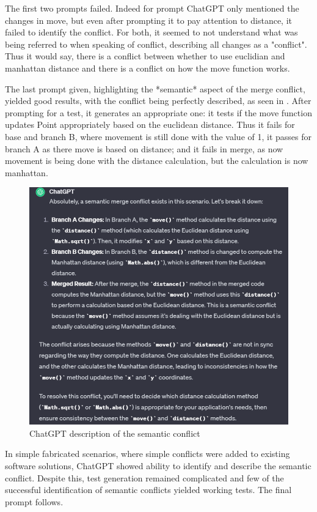 The first two prompts failed. Indeed for prompt ChatGPT only mentioned the changes in move, but even after prompting it to pay attention to distance, it failed to identify the conflict. For both, it seemed to not understand what was being referred to when speaking of conflict, describing all changes as a "conflict". Thus it would say, there is a conflict between whether to use euclidian and manhattan distance and there is a conflict on how the move function works.

The last prompt given, highlighting the *semantic* aspect of the merge conflict, yielded good results, with the conflict being perfectly described, as seen in . After prompting for a test, it generates an appropriate one: it tests if the move function updates Point appropriately based on the euclidean distance. Thus it fails for base and branch B, where movement is still done with the value of 1, it passes for branch A as there move is based on distance; and it fails in merge, as now movement is being done with the distance calculation, but the calculation is now manhattan.

\begin{figure}
    \centering
    \includegraphics[width=0.75\linewidth]{figures/image.png}
    \caption{ChatGPT description of the semantic conflict}
    \label{fig:semconf}
\end{figure}

In simple fabricated scenarios, where simple conflicts were added to existing software solutions, ChatGPT showed ability to identify and describe the semantic conflict. Despite this, test generation remained complicated and few of the successful identification of semantic conflicts yielded working tests. The final prompt follows.

